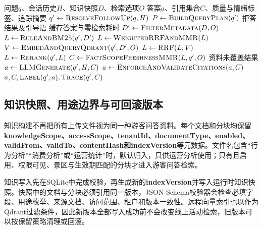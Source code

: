 \begin{algorithm}[H]
  \caption{混合检索与有据生成算法}\label{alg:rag}
  \begin{algorithmic}[1]
    \Require 问题$q$、会话历史$H$、知识快照$D$、检索选项$O$
    \Ensure 答案$a$、引用集合$C$、质量与情绪标签、追踪摘要
    \State $q' \gets \Call{ResolveFollowUp}{q,H}$ 
    \State $P \gets \Call{BuildQueryPlan}{q'}$ 
      \State \Return 拒答结果及引导语 
    \EndIf
      \State \Return 缓存答案与零检索耗时 
    \EndIf
    \State $D' \gets \Call{FilterMetadata}{D,O}$ 
    \State $L \gets \Call{RuleAndBM25}{q',D'}$ 
    \State $L \gets \Call{WeightedRRFAndMMR}{L}$ 
      \State $V \gets \Call{EmbedAndQueryQdrant}{q',D',O}$ 
      \State $L \gets \Call{RRF}{L,V}$
      \State $L \gets \Call{Rerank}{q',L}$ 
    \EndIf
    \State $C \gets \Call{FactScopeFreshnessMMR}{L,q',O}$
      \State \Return 资料未覆盖结果 
    \EndIf
    \State $a \gets \Call{LLMGenerate}{q',H,C}$ 
    \State $a \gets \Call{EnforceAndValidateCitations}{a,C}$
    \State \Return $a,C,\Call{Label}{q',a},\Call{Trace}{q',C}$
  \end{algorithmic}
\end{algorithm}

\subsection{知识快照、用途边界与可回滚版本}

知识构建不再把所有上传文件视为同一种游客问答资料。每个文档和分块均保留\textbf{knowledgeScope、accessScope、tenantId、documentType、enabled、validFrom、validTo、contentHash和indexVersion}等元数据。文件名包含“行为分析”“消费分析”或“运营统计”时，默认归入，只供运营分析使用；只有且启用、权限可见、景区与生效期匹配的分块才进入游客问答检索。

知识写入先在SQLite中完成校验，再生成新的\textbf{indexVersion}并写入运行时知识快照。快照中的文档与分块必须引用同一版本，JSON Schema校验器会检查必填字段、用途枚举、来源文档、访问范围、租户和版本一致性。远程向量索引也以作为Qdrant过滤条件，因此新版本全部写入成功前不会改变线上活动检索，旧版本可以按保留策略清理或回滚。

